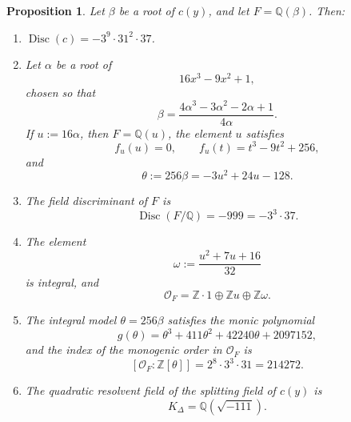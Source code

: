 \documentclass[11pt,letterpaper]{article}
\theoremstyle{plain}
\newtheorem{proposition}[theorem]{Proposition}
\theoremstyle{remark}
\newcommand{\QQ}{\mathbb{Q}}
\newcommand{\ZZ}{\mathbb{Z}}
\newcommand{\Disc}{\operatorname{Disc}}
\begin{document}
\begin{proposition}\label{prop:number-field}
Let \(\beta\) be a root of \(c(y)\), and let \(F=\QQ(\beta)\).
Then:
\begin{enumerate}
\item[(i)] \(\Disc(c)=-3^9\cdot 31^2\cdot 37\).
\item[(ii)] Let \(\alpha\) be a root of
\[
16x^3-9x^2+1,
\]
chosen so that
\[
\beta=\frac{4\alpha^3-3\alpha^2-2\alpha+1}{4\alpha}.
\]
If \(u:=16\alpha\), then \(F=\QQ(u)\), the element \(u\) satisfies
\[
f_u(u)=0,\qquad f_u(t)=t^3-9t^2+256,
\]
and
\[
\theta:=256\beta=-3u^2+24u-128.
\]
\item[(iii)] The field discriminant of \(F\) is
\[
\Disc(F/\QQ)=-999=-3^3\cdot 37.
\]
\item[(iv)] The element
\[
\omega:=\frac{u^2+7u+16}{32}
\]
is integral, and
\[
\mathcal O_F=\ZZ\cdot 1\oplus \ZZ u\oplus \ZZ\omega.
\]
\item[(v)] The integral model \(\theta=256\beta\) satisfies the monic polynomial
\[
g(\theta)=\theta^3+411\theta^2+42240\theta+2097152,
\]
and the index of the monogenic order in \(\mathcal O_F\) is
\[
[\mathcal O_F:\ZZ[\theta]]=2^8\cdot 3^3\cdot 31=214272.
\]
\item[(vi)] The quadratic resolvent field of the splitting field of \(c(y)\) is
\[
K_\Delta=\QQ(\sqrt{-111}).
\]
\end{enumerate}
\end{proposition}
\end{document}
